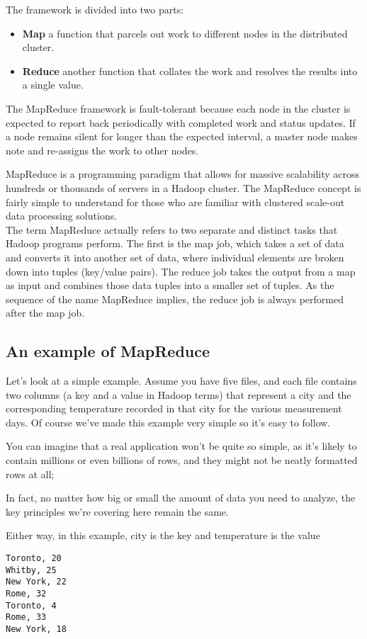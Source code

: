 \documentclass[11pt]{article} %
\begin{document}
The framework is divided into two parts:
\begin{itemize}
\item \textbf{Map} a function that parcels out work to different nodes in the distributed cluster.
\item \textbf{Reduce} another function that collates the work and resolves the results into a single value.
\end{itemize}

The MapReduce framework is fault-tolerant because each node in the cluster is expected to report back periodically with completed work and status updates. If a node remains silent for longer than the expected interval, a master node makes note and re-assigns the work to other nodes.


MapReduce is a programming paradigm that allows for massive scalability across hundreds or thousands of servers in a Hadoop cluster. The MapReduce concept is fairly simple to understand for those who are familiar with clustered scale-out data processing solutions.
\\
The term MapReduce actually refers to two separate and distinct tasks that Hadoop programs perform. The first is the map job, which takes a set of data and converts it into another set of data, where individual elements are broken down into tuples (key/value pairs). The reduce job takes the output from a map as input and combines those data tuples into a smaller set of tuples. As the sequence of the name MapReduce implies, the reduce job is always performed after the map job.
\subsection{An example of MapReduce}
Let’s look at a simple example. Assume you have five files, and each file contains two columns (a key and a value in Hadoop terms) that represent a city and the corresponding temperature recorded in that city for the various measurement days. Of course we’ve made this example very simple so it’s easy to follow. 

You can imagine that a real application won’t be quite so simple, as it’s likely to contain millions or even billions of rows, and they might not be neatly formatted rows at all; 

In fact, no matter how big or small the amount of data you need to analyze, the key principles we’re covering here remain the same. 

Either way, in this example, city is the key and temperature is the value
\begin{verbatim}
Toronto, 20
Whitby, 25
New York, 22
Rome, 32
Toronto, 4
Rome, 33
New York, 18
\end{verbatim}
\end{document}
